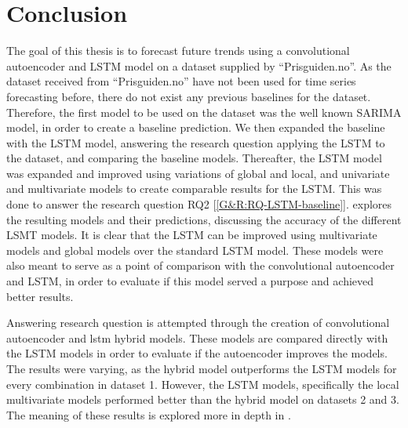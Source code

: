 \section{Conclusion}
\label{section:Discussion:Conclusion}


The goal of this thesis is to forecast future trends using a convolutional autoencoder and LSTM model
on a dataset supplied by ``Prisguiden.no''.
As the dataset received from ``Prisguiden.no'' have not been used for time series forecasting before,
there do not exist any previous baselines for the dataset.
Therefore, the first model to be used on the dataset was the well known SARIMA model,
in order to create a baseline prediction.
We then expanded the baseline with the LSTM model, answering the research question 
applying the LSTM to the dataset, and comparing the baseline models.
Thereafter, the LSTM model was expanded and improved using variations of global and local, and univariate and multivariate models
to create comparable results for the LSTM.
This was done to answer the research question RQ2 [\ref{G&R:RQ-LSTM-baseline}].
 explores the resulting models and their predictions, discussing the accuracy of the different LSMT models.
It is clear that the LSTM can be improved using multivariate models and global models over the standard LSTM model.
These models were also meant to serve as a point of comparison with the convolutional autoencoder and LSTM,
in order to evaluate if this model served a purpose and achieved better results.

Answering research question  is attempted through the creation of convolutional autoencoder and lstm hybrid models.
These models are compared directly with the LSTM models in order to evaluate if the autoencoder improves the models.
The results were varying, as the hybrid model outperforms the LSTM models for every combination in dataset 1.
However, the LSTM models, specifically the local multivariate models performed better than the hybrid model on datasets 2 and 3.
The meaning of these results is explored more in depth in .

